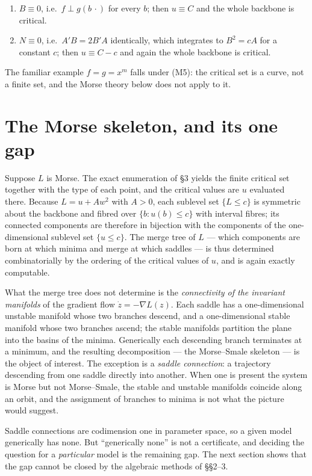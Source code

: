 \documentclass[11pt]{article}
\theoremstyle{plain}
\theoremstyle{definition}
\theoremstyle{remark}
\newcommand{\grad}{\nabla}
\begin{document}
\begin{enumerate}
\item[(M4)] $B \equiv 0$, i.e.\ $f \perp g(b\,\cdot)$ for every $b$; then
  $u \equiv C$ and the whole backbone is critical.
\item[(M5)] $N \equiv 0$, i.e.\ $A'B = 2B'A$ identically, which integrates to
  $B^2 = cA$ for a constant $c$; then $u \equiv C - c$ and again the whole
  backbone is critical.
\end{enumerate}

The familiar example $f = g = x^m$ falls under (M5): the critical set is a
curve, not a finite set, and the Morse theory below does not apply to it.

\section{The Morse skeleton, and its one gap}\label{sec:skeleton}

Suppose $L$ is Morse. The exact enumeration of \S3 yields the finite critical
set together with the type of each point, and the critical values are
$u$ evaluated there. Because $L = u + Aw^2$ with $A > 0$, each sublevel set
$\{L \leq c\}$ is symmetric about the backbone and fibred over
$\{b : u(b) \leq c\}$ with interval fibres; its connected components are
therefore in bijection with the components of the one-dimensional sublevel set
$\{u \leq c\}$. The merge tree of $L$ --- which components are born at which
minima and merge at which saddles --- is thus determined combinatorially by
the ordering of the critical values of $u$, and is again exactly computable.

What the merge tree does not determine is the \emph{connectivity of the
invariant manifolds} of the gradient flow $\dot z = -\grad L(z)$. Each saddle
has a one-dimensional unstable manifold whose two branches descend, and a
one-dimensional stable manifold whose two branches ascend; the stable
manifolds partition the plane into the basins of the minima. Generically each
descending branch terminates at a minimum, and the resulting decomposition ---
the Morse--Smale skeleton --- is the object of interest. The exception is a
\emph{saddle connection}: a trajectory descending from one saddle directly into
another. When one is present the system is Morse but not Morse--Smale, the
stable and unstable manifolds coincide along an orbit, and the assignment of
branches to minima is not what the picture would suggest.

Saddle connections are codimension one in parameter space, so a given model
generically has none. But ``generically none'' is not a certificate, and
deciding the question for a \emph{particular} model is the remaining gap. The
next section shows that the gap cannot be closed by the algebraic methods of
\S\S2--3.
\end{document}
